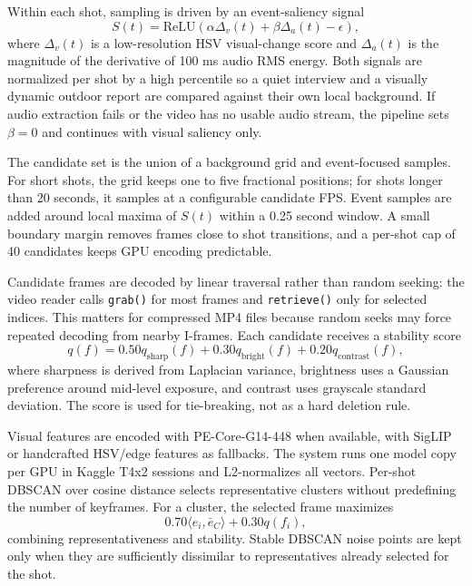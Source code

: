 \documentclass[conference]{IEEEtran}
\begin{document}
Within each shot, sampling is driven by an event-saliency signal
\begin{equation}
S(t)=\mathrm{ReLU}\left(\alpha \Delta_v(t)+\beta \Delta_a(t)-\epsilon\right),
\label{eq:saliency}
\end{equation}
where $\Delta_v(t)$ is a low-resolution HSV visual-change score and
$\Delta_a(t)$ is the magnitude of the derivative of 100 ms audio RMS energy.
Both signals are normalized per shot by a high percentile so a quiet interview
and a visually dynamic outdoor report are compared against their own local
background. If audio extraction fails or the video has no usable audio stream,
the pipeline sets $\beta=0$ and continues with visual saliency only.

The candidate set is the union of a background grid and event-focused samples.
For short shots, the grid keeps one to five fractional positions; for shots
longer than 20 seconds, it samples at a configurable candidate FPS. Event samples
are added around local maxima of $S(t)$ within a 0.25 second window. A small
boundary margin removes frames close to shot transitions, and a per-shot cap of
40 candidates keeps GPU encoding predictable.

Candidate frames are decoded by linear traversal rather than random seeking:
the video reader calls \texttt{grab()} for most frames and \texttt{retrieve()}
only for selected indices. This matters for compressed MP4 files because random
seeks may force repeated decoding from nearby I-frames. Each candidate receives
a stability score
\begin{equation}
q(f)=0.50 q_{\mathrm{sharp}}(f)+0.30 q_{\mathrm{bright}}(f)+0.20 q_{\mathrm{contrast}}(f),
\end{equation}
where sharpness is derived from Laplacian variance, brightness uses a Gaussian
preference around mid-level exposure, and contrast uses grayscale standard
deviation. The score is used for tie-breaking, not as a hard deletion rule.

Visual features are encoded with PE-Core-G14-448
\cite{bolya2025perceptionencoder} when available, with SigLIP
\cite{zhai2023siglip} or handcrafted HSV/edge features as fallbacks. The system
runs one model copy per GPU in Kaggle T4x2 sessions and L2-normalizes all
vectors. Per-shot DBSCAN \cite{ester1996dbscan} over cosine distance selects
representative clusters without predefining the number of keyframes. For a
cluster, the selected frame maximizes
\begin{equation}
0.70 \langle e_i,\bar{e}_C\rangle + 0.30 q(f_i),
\end{equation}
combining representativeness and stability. Stable DBSCAN noise points are kept
only when they are sufficiently dissimilar to representatives already selected
for the shot.
\end{document}
